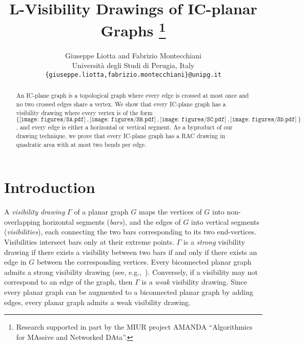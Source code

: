 \documentclass[a4paper]{article}
\newcommand{\SA}{\texttt{[image: figures/SA.pdf]}~}
\newcommand{\SB}{\texttt{[image: figures/SB.pdf]}~}
\newcommand{\SC}{\texttt{[image: figures/SC.pdf]}~}
\newcommand{\SD}{\texttt{[image: figures/SD.pdf]}~}
\newcommand{\shapes}{$\{\SA,\SB,\SC,\SD\}$\xspace}
\begin{document}
\title{L-Visibility Drawings of IC-planar Graphs
\thanks{Research supported in part by the MIUR project AMANDA ``Algorithmics for MAssive and Networked DAta''.}}
    
\author{Giuseppe Liotta and Fabrizio Montecchiani\\Universit{\`a} degli Studi di Perugia, Italy\\ \texttt{\small\{giuseppe.liotta,fabrizio.montecchiani\}@unipg.it}} 

\date{}

\maketitle

\begin{abstract}
An IC-plane graph is a topological graph where every edge is crossed at most once and no two crossed edges share a vertex. We show that every IC-plane graph has a visibility drawing where every vertex is of the form \shapes, and every edge is either a horizontal or vertical segment. As a byproduct of our drawing technique, we prove that every IC-plane graph has a RAC drawing in quadratic area with at most two bends per edge.
\end{abstract}






\section{Introduction}

A \emph{visibility drawing} $\Gamma$ of a planar graph $G$ maps the vertices of $G$ into non-overlapping horizontal segments (\emph{bars}), and the edges of $G$ into  vertical segments (\emph{visibilities}), each connecting the two bars corresponding to its two end-vertices. Visibilities intersect bars only at their extreme points. $\Gamma$ is a \emph{strong} visibility drawing if there exists a visibility between two bars if and only if there exists an edge in $G$ between the corresponding vertices. Every biconnected planar graph admits a strong visibility drawing (see, e.g.,~\cite{TamassiaTollis86}). Conversely, if a visibility may not correspond to an edge of the graph, then $\Gamma$ is a {\em weak} visibility drawing. Since every planar graph can be augmented to a biconnected planar graph by adding edges, every planar graph admits a weak visibility drawing. 
\end{document}
